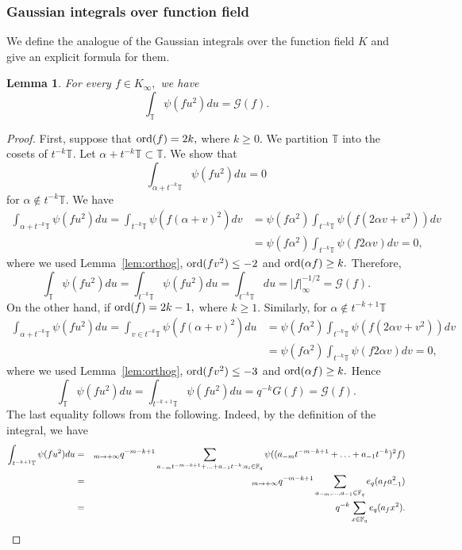 \documentclass[11pt]{amsart}
\theoremstyle{plain}
\theoremstyle{plain}
\newtheorem{lemma}[theorem]{Lemma}
\theoremstyle{remark}
\theoremstyle{definition}
\let\lim=\relax
\DeclareMathOperator*{\lim}{lim}
\newcommand{\ord}{\textup{ord}}
\newcommand{\TT}{\mathbb{T}}
\newcommand{\cG}{\mathcal{G}}
\begin{document}
\subsubsection{Gaussian integrals over function field }
We define the analogue of the  Gaussian integrals over the  function field $K$ and give an explicit formula for them. 
\begin{lemma}\label{ggg} For every $f\in K_{\infty},$
we have 
\[
\int_{\TT} \psi(fu^2) du=\cG(f).
\]

\end{lemma}
\begin{proof}First, suppose that $\ord(f)=2k,$ where $k\geq 0.$ We partition $\TT$ into the cosets of $ t^{-k} \TT.$ Let $\alpha + t^{-k} \TT \subset \TT.$ We show that 
\[
\int_{\alpha + t^{-k} \TT} \psi(fu^2) du= 0
\]
for $\alpha \notin t^{-k} \TT.$ We have 
\begin{equation*}
\begin{split}
\int_{\alpha + t^{-k} \TT} \psi(fu^2) du= \int_{t^{-k} \TT} \psi(f(\alpha +v)^2) dv
&=\psi(f\alpha^2 )\int_{t^{-k} \TT} \psi(f(2\alpha v +v^2)) dv
\\
&=\psi(f\alpha^2 )\int_{t^{-k} \TT} \psi(f2\alpha v ) dv=0,
\end{split}
\end{equation*}
where we used Lemma~\ref{lem:orthog}, $\ord(fv^2)\leq -2$ and $\ord(\alpha f )\geq k.$ Therefore, 
\[
\int_{\TT} \psi(fu^2) du=\int_{ t^{-k} \TT} \psi(fu^2) du=\int_{ t^{-k} \TT}  du =|f|^{-1/2}_{\infty}=\mathcal{G}(f).
\]
On the other hand, if $\ord(f)=2k-1,$ where $k\geq 1.$ Similarly, for $\alpha \notin t^{-k+1} \TT$ 
\begin{equation*}
\begin{split}
\int_{\alpha + t^{-k} \TT} \psi(fu^2) du= \int_{v\in t^{-k} \TT} \psi(f(\alpha +v)^2) du
&=\psi(f\alpha^2 )\int_{ t^{-k} \TT} \psi(f(2\alpha v +v^2)) dv
\\
&=\psi(f\alpha^2 )\int_{t^{-k} \TT} \psi(f2\alpha v ) dv=0,
\end{split}
\end{equation*}
where we used Lemma~\ref{lem:orthog}, $\ord(fv^2)\leq -3$ and $\ord(\alpha f )\geq k.$ Hence
\[
\int_{\TT} \psi(fu^2) du=\int_{ t^{-k+1}\TT} \psi(fu^2) du=q^{-k}G(f)=\mathcal{G}(f).
\]
The last equality follows from the following. Indeed, by the definition of the integral, we have
\begin{eqnarray*}
\int_{t^{-k+1}\TT} \psi(fu^2) du&=& \lim_{m\rightarrow +\infty}q^{-m-k+1}\sum_{a_{-m}t^{-m-k+1}+\hdots+a_{-1}t^{-k}:a_i\in\mathbb{F}_q}\psi((a_{-m}t^{-m-k+1}+\hdots+a_{-1}t^{-k})^2f)\\&=& \lim_{m\rightarrow +\infty}q^{-m-k+1}\sum_{a_{-m},\hdots,a_{-1}\in\mathbb{F}_q}e_q(a_fa_{-1}^2)\\ &=& q^{-k}\sum_{x\in\mathbb{F}_q}e_q(a_fx^2).

\end{eqnarray*}
\end{proof}
\end{document}
